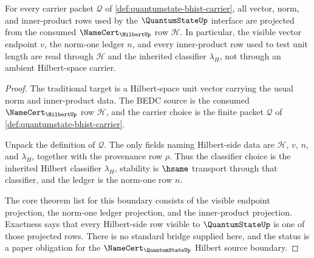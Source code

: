 \begin{theorem}
\label{thm:quantumstate-hilbert-source-boundary}
For every carrier packet $\mathcal{Q}$ of
\autoref{def:quantumstate-bhist-carrier}, all vector, norm, and inner-product
rows used by the $\QuantumStateUp$ interface are projected from the consumed
$\NameCert_{\HilbertUp}$ row $\mathcal{H}$. In particular, the visible vector
endpoint $v$, the norm-one ledger $n$, and every inner-product row used to test
unit length are read through $\mathcal{H}$ and the inherited classifier
$\lambda_H$, not through an ambient Hilbert-space carrier.
\end{theorem}
\begin{proof}
The traditional target is a Hilbert-space unit vector carrying the usual norm
and inner-product data. The BEDC source is the consumed
$\NameCert_{\HilbertUp}$ row $\mathcal{H}$, and the carrier choice is the finite
packet $\mathcal{Q}$ of \autoref{def:quantumstate-bhist-carrier}.

Unpack the definition of $\mathcal{Q}$. The only fields naming Hilbert-side
data are $\mathcal{H}$, $v$, $n$, and $\lambda_H$, together with the provenance
row $\rho$. Thus the classifier choice is the inherited Hilbert classifier
$\lambda_H$, stability is $\hsame$ transport through that classifier, and the
ledger is the norm-one row $n$.

The core theorem list for this boundary consists of the visible endpoint
projection, the norm-one ledger projection, and the inner-product projection.
Exactness says that every Hilbert-side row visible to $\QuantumStateUp$ is one
of those projected rows. There is no standard bridge supplied here, and the
status is a paper obligation for the $\NameCert_{\QuantumStateUp}$ Hilbert
source boundary.
\end{proof}

